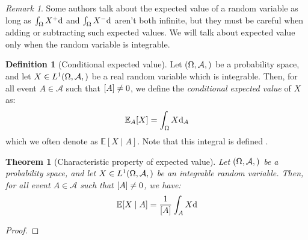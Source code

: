 \documentclass{article}
\newtheorem{theorem}{Theorem}[section]
\theoremstyle{definition}
\newtheorem{definition}{Definition}[section]
\theoremstyle{remark}
\newtheorem*{remark}{Remark}
\theoremstyle{example}
\theoremstyle{notation}
\newcommand{\E}[1]{\mathbb{E}[#1]}
\let\P\relax
\begin{document}
\begin{remark}
		Some authors talk about the expected value of a random variable as long as $\int_\Omega X^+ \dd \P$ and $\int_\Omega X^- \dd \P$ aren't both infinite, but they must be careful when adding or subtracting such expected values. We will talk about expected value only when the random variable is integrable.
\end{remark}

\begin{definition}[Conditional expected value] %
		Let $(\Omega, \mathcal{A}, \P)$ be a probability space, and let $X \in L^1(\Omega, \mathcal{A}, \P)$ be a real random variable which is integrable. Then, for all event $A \in \mathcal{A}$ such that $\P[A] \neq 0$, we define the \textit{conditional expected value} of $X$ as:
				$$\mathbb{E}_A[X] = \int_\Omega X \dd \P_A$$
		which we often denote as $\E{X \mid A}$. Note that this integral is defined \fbox{because $L^1(\Omega, \mathcal{A}, \P) = L^1(\Omega, \mathcal{A}, \P_A)$}.
\end{definition}

\begin{theorem}[Characteristic property of expected value] 
		Let $(\Omega, \mathcal{A}, \P)$ be a probability space, and let $X \in L^1(\Omega, \mathcal{A}, \P)$ be an integrable random variable. Then, for all event $A \in \mathcal{A}$ such that $\P[A] \neq 0$, we have:
				$$\E{X \mid A} = \frac{1}{\P[A]}\int_A X \dd \P$$
\end{theorem}

\begin{proof}
\end{proof}


\end{document}
